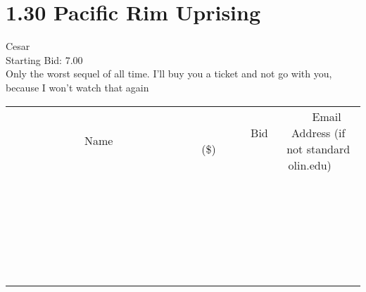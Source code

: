 \documentclass[11pt]{article}
\begin{document}
					\section*{1.30 Pacific Rim Uprising}
					Cesar \\
					Starting Bid: 7.00 \\
					Only the worst sequel of all time. I'll buy you a ticket and not go with you, because I won't watch that again \\
					[6ex]
					\begin{tabular}{c c c}
						~~~~~~~~~~~~~Name~~~~~~~~~~~~~ & ~~~~~~~~~Bid (\$)~~~~~~~~~ & ~~~Email Address (if not standard olin.edu)~~~ \\
				
 & & \\
\hline
 & & \\
\hline
 & & \\
\hline
 & & \\
\hline
 & & \\
\hline
 & & \\
\hline
 & & \\
\hline
 & & \\
\hline
 & & \\
\hline
 & & \\
\hline
 & & \\
\hline
 & & \\
\hline
 & & \\
\hline
 & & \\
\hline
 & & \\
\hline
 & & \\
\hline
 & & \\
\hline
 & & \\
\hline
 & & \\
\hline
 & & \\
\hline
 & & \\
\hline
 & & \\
\hline
 & & \\
\hline
 & & \\
\hline
 & & \\
\hline
 & & \\
\hline
					\end{tabular}
					\clearpage
				
\end{document}
